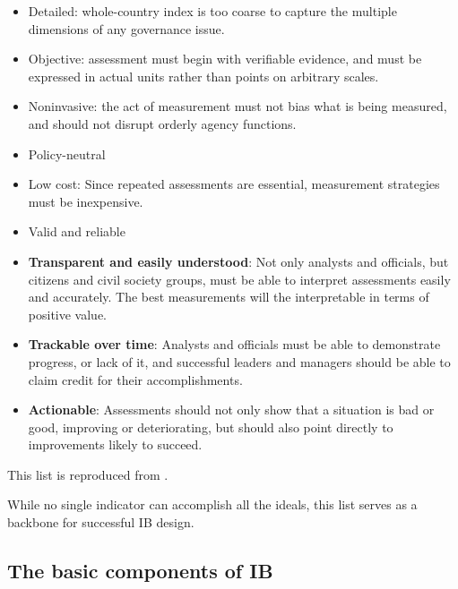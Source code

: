 \documentclass[12pt]{article}
\begin{document}
\begin{itemize}[noitemsep]
\item{Detailed: whole-country index is too coarse to capture the multiple dimensions of any governance issue.}
\item{Objective: assessment must begin with verifiable evidence, and must be expressed in actual units rather than points on arbitrary scales.}
\item{Noninvasive: the act of measurement must not bias what is being measured, and should not disrupt orderly agency functions.}
\item{Policy-neutral}
\item{Low cost: Since repeated assessments are essential, measurement strategies must be inexpensive.}
\item{Valid and reliable}
\item{\textbf{Transparent and easily understood}: Not only analysts and officials, but citizens and civil society groups, must be able to interpret assessments easily and accurately. The best measurements will the interpretable in terms of positive value.}
\item{\textbf{Trackable over time}: Analysts and officials must be able to demonstrate progress, or lack of it, and successful leaders and managers should be able to claim credit for their accomplishments.}
\item{\textbf{Actionable}: Assessments should not only show that a situation is bad or good, improving or deteriorating, but should also point directly to improvements likely to succeed.}
\end{itemize}

This list is reproduced from \citet{Johnston2010}.

While no single indicator can accomplish all the ideals, this list serves as a backbone for successful IB design.

\subsection{The basic components of IB} \label{sec:basicstrategy}
\end{document}
